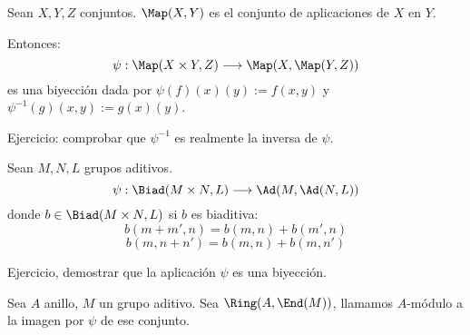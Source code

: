\begin{obs}
  Sean  \(X, Y, Z\) conjuntos. \(\Map(X,Y)\) es el conjunto de
  aplicaciones de \(X\) en \(Y\).

  Entonces:
  \[
    \psi:\Map(X\times Y, Z)\longrightarrow\Map(X,\Map(Y,Z))
  \]
  es una biyección dada por \(\psi(f)(x)(y):=f(x,y)\) y
  \(\psi^{-1}(g)(x,y):=g(x)(y)\).
\end{obs}

Ejercicio: comprobar que \(\psi^{-1}\) es realmente la inversa de
\(\psi\).

\begin{obs}
  Sean \(M, N, L\) grupos aditivos.
  \[
    \psi:\Biad(M\times N, L)\longrightarrow\Ad(M,\Ad(N,L))
  \]
  donde \(b\in\Biad(M\times N, L)\) si \(b\) es biaditiva:
  \[
    b(m+m',n)=b(m,n)+b(m',n)
  \]\[
    b(m,n+n')=b(m,n)+b(m,n')
  \]
\end{obs}

Ejercicio, demostrar que la aplicación \(\psi\) es una biyección.

\begin{teo}
  Sea \(A\) anillo, \(M\) un grupo aditivo. Sea \(\Ring(A,\End(M))\),
  llamamos \(A\)-módulo a la imagen por \(\psi\) de ese conjunto.
\end{teo}
